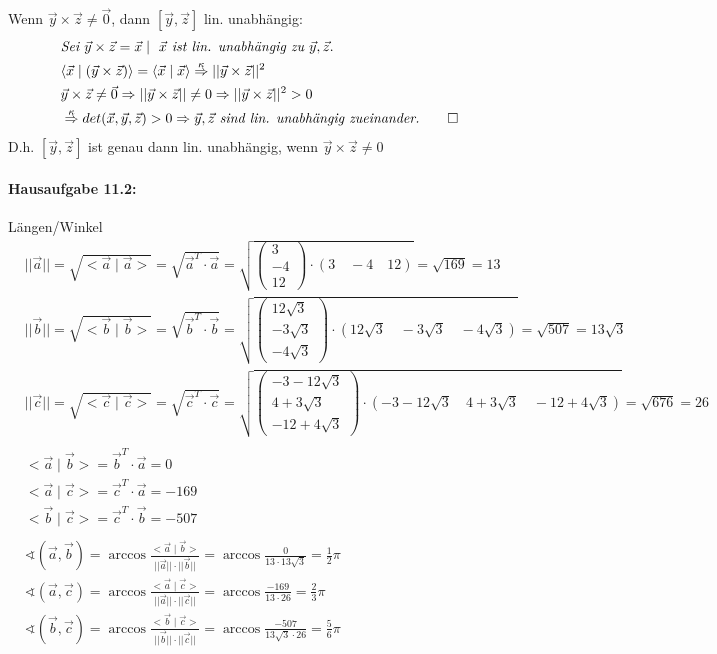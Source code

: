 \documentclass[titlepage]{article}
\newcommand{\1}{\mathbb{1}}
\newcommand{\0}{\mathbb{0}}
\newcommand{\vecD}[3]{\left(\begin{smallmatrix}#1\\#2\\#3\end{smallmatrix}\right)}
\begin{document}
		Wenn $\vec{y}\times\vec{z}\neq\vec{0}$, dann $[\vec{y},\vec{z}]$ lin. unabhängig:
		\begin{align*}
			&\textit{Sei }\vec{y}\times\vec{z}=\vec{x}\mid\textit{ $\vec{x}$ ist lin. unabhängig zu }\vec{y},\vec{z}.\\
			&\langle\vec{x}\mid(\vec{y}\times\vec{z})\rangle=\langle\vec{x}\mid\vec{x}\rangle\overset{\kappa}{\Rightarrow}||\vec{y}\times\vec{z}||^2\\
			&\vec{y}\times\vec{z}\neq\vec{0}
			\Rightarrow||\vec{y}\times\vec{z}||\neq0
			\Rightarrow||\vec{y}\times\vec{z}||^2>0\\
			&\overset{\kappa}{\Rightarrow} det(\vec{x},\vec{y},\vec{z})>0\Rightarrow\vec{y},\vec{z}\textit{ sind lin. unabhängig zueinander.}\qed
		\end{align*}
		D.h. $[\vec{y},\vec{z}]$ ist genau dann lin. unabhängig, wenn $\vec{y}\times\vec{z}\neq0$

	\paragraph{Hausaufgabe 11.2: } Längen/Winkel
		\begin{align*}
			&||\vec{a}||=\sqrt{<\vec{a}\mid\vec{a}>}=\sqrt{\vec{a}^T\cdot\vec{a}}=\sqrt{\vecD{3}{-4}{12}\cdot(3\quad-4\quad12)}=\sqrt{169}=13\\
			&||\vec{b}||=\sqrt{<\vec{b}\mid\vec{b}>}=\sqrt{\vec{b}^T\cdot\vec{b}}=\sqrt{\vecD{12\sqrt{3}}{-3\sqrt{3}}{-4\sqrt{3}}\cdot(12\sqrt{3}\quad-3\sqrt{3}\quad-4\sqrt{3})}=\sqrt{507}=13\sqrt{3}\\
			&||\vec{c}||=\sqrt{<\vec{c}\mid\vec{c}>}=\sqrt{\vec{c}^T\cdot\vec{c}}=\sqrt{\vecD{-3-12\sqrt{3}}{4+3\sqrt{3}}{-12+4\sqrt{3}}\cdot(-3-12\sqrt{3}\quad4+3\sqrt{3}\quad-12+4\sqrt{3})}=\sqrt{676}=26\\\\
			&<\vec{a}\mid\vec{b}>=\vec{b}^T\cdot\vec{a}=0\\
			&<\vec{a}\mid\vec{c}>=\vec{c}^T\cdot\vec{a}=-169\\
			&<\vec{b}\mid\vec{c}>=\vec{c}^T\cdot\vec{b}=-507\\\\
			&\sphericalangle(\vec{a},\vec{b})=\arccos\frac{<\vec{a}\mid\vec{b}>}{||\vec{a}||\cdot||\vec{b}||}=\arccos\frac{0}{13\cdot13\sqrt{3}}=\frac{1}{2}\pi\\
			&\sphericalangle(\vec{a},\vec{c})=\arccos\frac{<\vec{a}\mid\vec{c}>}{||\vec{a}||\cdot||\vec{c}||}=\arccos\frac{-169}{13\cdot26}=\frac{2}{3}\pi\\
			&\sphericalangle(\vec{b},\vec{c})=\arccos\frac{<\vec{b}\mid\vec{c}>}{||\vec{b}||\cdot||\vec{c}||}=\arccos\frac{-507}{13\sqrt{3}\cdot26}=\frac{5}{6}\pi
		\end{align*}
	
\end{document}

